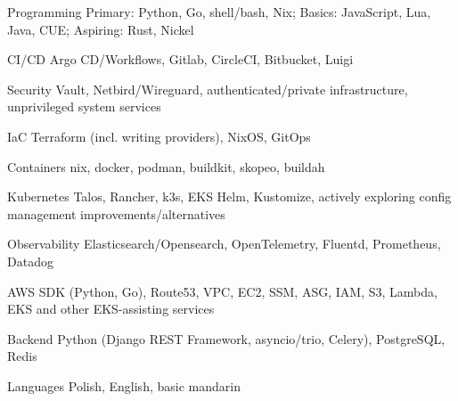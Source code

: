 

\begin{cvskills}

    \cvskill
    {Programming} %
    {Primary: Python, Go, shell/bash, Nix; Basics: JavaScript, Lua, Java, CUE; Aspiring: Rust, Nickel} %

    \cvskill
    {CI/CD} %
    {Argo CD/Workflows, Gitlab, CircleCI, Bitbucket, Luigi} %

    \cvskill
    {Security} %
    {Vault, Netbird/Wireguard, authenticated/private infrastructure, unprivileged system services} %

    \cvskill
    {IaC} %
    {Terraform (incl. writing providers), NixOS, GitOps} %

    \cvskill
    {Containers} %
    {nix, docker, podman, buildkit, skopeo, buildah} %

    \cvskill
    {Kubernetes} %
    {
        Talos, Rancher, k3s, EKS
    \newline
    Helm, Kustomize, actively exploring config management improvements/alternatives
    } %

    \cvskill
    {Observability} %
    {Elasticsearch/Opensearch, OpenTelemetry, Fluentd, Prometheus, Datadog} %

    \cvskill
    {AWS} %
    {SDK (Python, Go), Route53, VPC, EC2, SSM, ASG, IAM, S3, Lambda, EKS and other EKS-assisting services} %

    \cvskill
    {Backend} %
    {Python (Django REST Framework, asyncio/trio, Celery), PostgreSQL, Redis} %

    \cvskill
    {Languages} %
    {Polish, English, basic mandarin} %

\end{cvskills}

